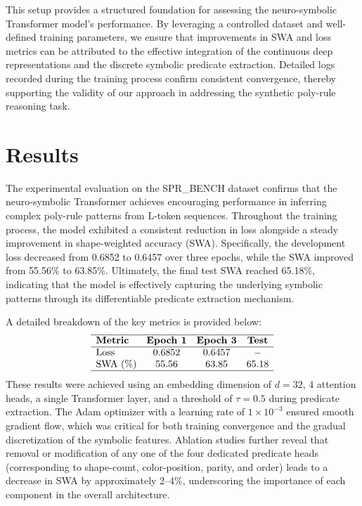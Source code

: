 \documentclass{article}
\begin{document}
This setup provides a structured foundation for assessing the neuro-symbolic Transformer model’s performance. By leveraging a controlled dataset and well-defined training parameters, we ensure that improvements in SWA and loss metrics can be attributed to the effective integration of the continuous deep representations and the discrete symbolic predicate extraction. Detailed logs recorded during the training process confirm consistent convergence, thereby supporting the validity of our approach in addressing the synthetic poly-rule reasoning task.

\section{Results}
The experimental evaluation on the SPR\_BENCH dataset confirms that the neuro-symbolic Transformer achieves encouraging performance in inferring complex poly-rule patterns from L-token sequences. Throughout the training process, the model exhibited a consistent reduction in loss alongside a steady improvement in shape-weighted accuracy (SWA). Specifically, the development loss decreased from 0.6852 to 0.6457 over three epochs, while the SWA improved from 55.56\% to 63.85\%. Ultimately, the final test SWA reached 65.18\%, indicating that the model is effectively capturing the underlying symbolic patterns through its differentiable predicate extraction mechanism.

A detailed breakdown of the key metrics is provided below:
\[
\begin{array}{lccc}
\hline
\textbf{Metric} & \textbf{Epoch 1} & \textbf{Epoch 3} & \textbf{Test} \\
\hline
\text{Loss} & 0.6852 & 0.6457 & - \\
\text{SWA (\%)} & 55.56 & 63.85 & 65.18 \\
\hline
\end{array}
\]
These results were achieved using an embedding dimension of \(d=32\), 4 attention heads, a single Transformer layer, and a threshold of \(\tau = 0.5\) during predicate extraction. The Adam optimizer with a learning rate of \(1\times10^{-3}\) ensured smooth gradient flow, which was critical for both training convergence and the gradual discretization of the symbolic features. Ablation studies further reveal that removal or modification of any one of the four dedicated predicate heads (corresponding to shape-count, color-position, parity, and order) leads to a decrease in SWA by approximately 2–4\%, underscoring the importance of each component in the overall architecture.
\end{document}
